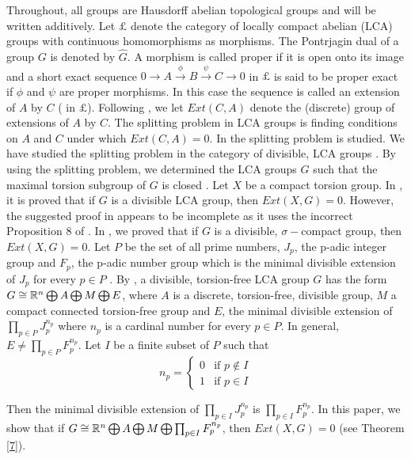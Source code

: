 \documentclass{amsart}
\theoremstyle{definition}
\theoremstyle{remark}
\numberwithin{equation}{section}
\begin{document}
 Throughout, all groups are Hausdorff  abelian topological groups and will be written additively. Let $\pounds$ denote the category of locally compact abelian (LCA) groups with continuous homomorphisms as morphisms. The Pontrjagin dual of a group $G$ is denoted by $\hat{G}$. A morphism is called proper if it is open onto its image and a short exact sequence $0\to A\stackrel{\phi}{\to} B\stackrel{\psi}{\to}C\to 0$ in $\pounds$ is said to be proper exact if $\phi$ and $\psi$ are proper morphisms. In this case the sequence is called an extension of $A$ by $C$ ( in $\pounds$). Following \cite{FG1}, we let $Ext(C,A)$ denote the (discrete) group of extensions of $A$ by $C$. The splitting problem in LCA groups is finding conditions on $A$ and $C$ under which $Ext(C,A)=0$. In \cite{F1,F2,FG2} the splitting problem is studied. We have studied the splitting problem in the category of divisible, LCA groups \cite{SA1}. By using the splitting problem, we determined the LCA groups $G$ such that the maximal torsion subgroup of $G$ is closed \cite{SA2}. Let $X$ be a compact torsion group. In \cite[Theorem 1]{F2}, it is proved that if $G$ is a divisible LCA group, then $Ext(X,G)=0$. However, the suggested proof in \cite{F2} appears to be incomplete as it uses the incorrect Proposition 8 of \cite{F1}. In \cite{SA1}, we proved that if $G$ is a divisible, $\sigma-$compact group, then $Ext(X,G)=0$. Let $P$ be the set of all prime numbers, $J_{p}$, the p-adic integer group and $F_{p}$, the p-adic number group which is the minimal divisible extension of $J_{p}$  for every $p\in P$ \cite{HR}. By \cite[25.33]{HR}, a divisible, torsion-free LCA group $G$ has the form $G\cong \Bbb R^{n}\bigoplus A\bigoplus M\bigoplus E$, where $A$ is a discrete, torsion-free, divisible group, $M$ a compact connected torsion-free group and $E$, the minimal divisible extension of $\prod_{p\in P}J_{p}^{n_{p}}$ where $n_{p}$ is a cardinal number for every $p\in P$. In general, $E\neq \prod_{p\in P}F_{p}^{n_{p}}$. Let $I$ be a finite subset of $P$ such that
 $$n_{p}=
\left\{
	\begin{array}{ll}
		0  & \mbox{if } p\not\in I \\
		1 & \mbox{if } p\in I
	\end{array}
\right.$$

Then the minimal divisible extension of $\prod_{p\in I}J_{p}^{n_{p}}$ is $\prod_{p\in I}F_{p}^{n_{p}}$. In this paper, we show that if $G\cong \Bbb R^{n}\bigoplus A\bigoplus M\bigoplus \prod_{p\in I} F_{p}^{n_{p}}$, then $Ext(X,G)=0$ (see Theorem \ref{7}).
\end{document}
